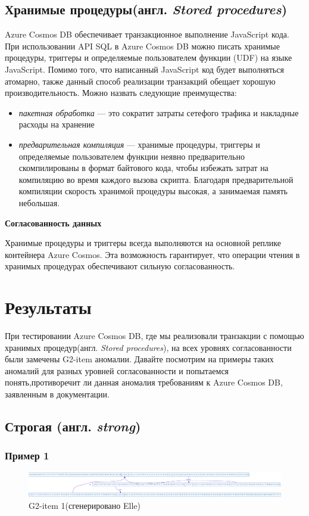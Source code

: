 \documentclass[12pt,  openany]{book}
\begin{document}
\subsection{Хранимые процедуры(англ. \textit{Stored procedures})}
Azure Cosmos DB обеспечивает транзакционное выполнение JavaScript кода. При использовании API SQL в Azure Cosmos DB можно писать хранимые процедуры, триггеры и определяемые пользователем функции (UDF) на языке JavaScript.
Помимо того, что написанный JavaScript код будет выполняться атомарно, также данный  способ реализации транзакций обещает хорошую производительность. Можно назвать следующие преимущества:
\begin{itemize}
\item \textit{пакетная обработка} --- это сократит затраты сетефого трафика и накладные расходы на хранение
\item  \textit{предварительная компиляция} --- хранимые процедуры, триггеры и определяемые пользователем функции неявно предварительно скомпилированы в формат байтового кода, чтобы избежать затрат на компиляцию во время каждого вызова скрипта. Благодаря предварительной компиляции скорость хранимой процедуры высокая, а занимаемая память небольшая.
\end{itemize}

\textbf{Согласованность данных}
\par
Хранимые процедуры и триггеры всегда выполняются на основной реплике контейнера Azure Cosmos. Эта возможность гарантирует, что операции чтения в хранимых процедурах обеспечивают сильную согласованность. 

\section{Результаты}
При тестировании Azure Cosmos DB, где мы реализовали транзакции с помощью хранимых процедур(англ. \textit{Stored procedures}), на всех уровнях согласованности были замечены G2-item  аномалии. Давайте посмотрим на примеры таких аномалий для разных уровней согласованности и попытаемся понять,противоречит ли данная аномалия требованиям к Azure Cosmos DB, заявленным в документации.
\subsection{Строгая (англ.  \textit{strong})}
\subsubsection{Пример 1}
\begin{figure}[H]
  \includegraphics[width=\textwidth]{strong/6.png}
  \caption{G2-item 1(сгенерировано Elle)}
\end{figure}
\par
\end{document}
